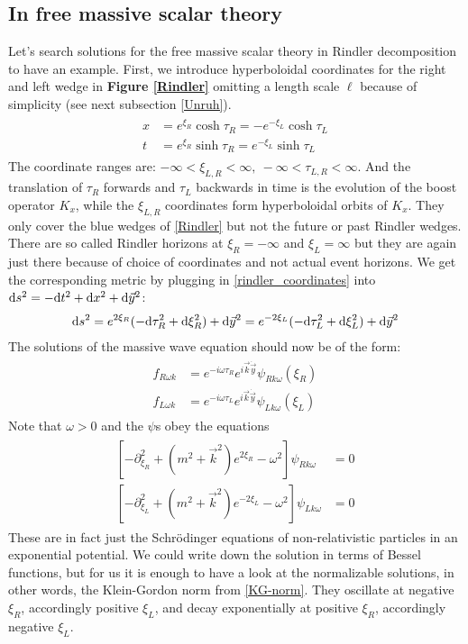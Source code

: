 \subsection{In free massive scalar theory \checkmark}	
	Let's search solutions for the free massive scalar theory in Rindler decomposition to have an example. First, we introduce hyperboloidal coordinates for the right and left wedge in \textbf{Figure \ref{Rindler}} omitting a length scale $\ell$ because of simplicity (see next subsection \ref{Unruh}).
	\begin{align} \label{rindler_coordinates}
		\begin{split}
		x &= e^{\xi_R} \cosh \tau_R = -e^{-\xi_L} \cosh \tau_L \\
		t &= e^{\xi_R} \sinh \tau_R = e^{-\xi_L} \sinh \tau_L
		\end{split}
	\end{align}
	The coordinate ranges are: $-\infty < \xi_{L,R} < \infty,~ -\infty < \tau_{L,R} < \infty$.
	And the translation of $\tau_R$ forwards and $\tau_L$ backwards in time is the evolution of the boost operator $K_x$, while the $\xi_{L,R}$ coordinates form hyperboloidal orbits of $K_x$. They only cover the blue wedges of \ref{Rindler} but not the future or past Rindler wedges. There are so called Rindler horizons at $\xi_R=-\infty$ and $\xi_L=\infty$ but they are again just there because of choice of coordinates and not actual event horizons. 
	We get the corresponding metric by plugging in \eqref{rindler_coordinates} into $\mathrm{d} s^2 = -\mathrm{d} t^2 + \mathrm{d} x^2 + \mathrm{d} \vec{y}^2$:
	\begin{align}
		\mathrm{d} s^2 = e^{2\xi_R} (-\mathrm{d} \tau_R^2 + \mathrm{d} \xi_R^2) + \mathrm{d} \vec{y}^2 
		= e^{-2\xi_L} (-\mathrm{d} \tau_L^2 + \mathrm{d} \xi_L^2) + \mathrm{d} \vec{y}^2
 	\end{align}
 	The solutions of the massive wave equation should now be of the form:
	\begin{align} \label{modes}
		\begin{split}
		f_{R\omega k} &= e^{-i\omega \tau_R} e^{i\vec{k}\dot \vec{y}} \psi_{Rk\omega}(\xi_R) \\
		f_{L\omega k} &= e^{-i\omega \tau_L} e^{i\vec{k}\dot \vec{y}} \psi_{Lk\omega}(\xi_L)
		\end{split}
	\end{align}
	Note that $\omega > 0$ and the $\psi$s obey the equations
	\begin{align}
	\begin{split}
		\left[
			-\partial^2_{\xi_R} + (m^2 + \vec{k}^2) e^{2\xi_R} - \omega^2
		\right] \psi_{Rk\omega} &= 0 \\
		\left[
			-\partial^2_{\xi_L} + (m^2 + \vec{k}^2) e^{-2\xi_L} - \omega^2
		\right] \psi_{Lk\omega} &= 0
	\end{split}
	\end{align} 
	These are in fact just the Schrödinger equations of non-relativistic particles in an exponential potential. We could write down the solution in terms of Bessel functions, but for us it is enough to have a look at the normalizable solutions, in other words, the Klein-Gordon norm from \eqref{KG-norm}. They oscillate at negative $\xi_R$, accordingly positive $\xi_L$, and decay exponentially at positive $\xi_R$, accordingly negative $\xi_L$.
	

